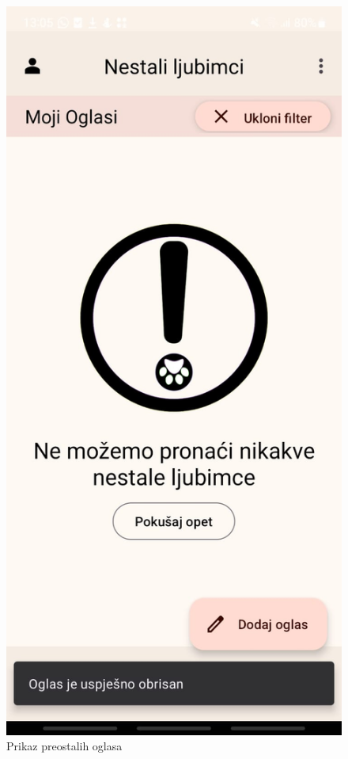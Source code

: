 			\begin{figure}[H]
				  \includegraphics[scale=0.3]{slike/app4v3.jpg}
				  \centering
				  \caption{Prikaz preostalih oglasa}
				  \label{fig:app4v3}
			\end{figure}	 
			
